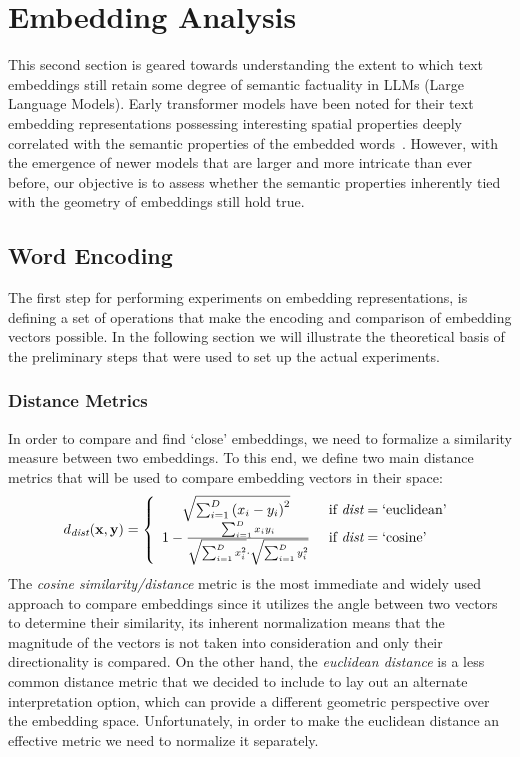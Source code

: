 \section{Embedding Analysis}\label{sec:method_embeddings}

This second section is geared towards understanding the extent to which text embeddings still retain some degree of semantic factuality in LLMs (Large Language Models).
Early transformer models have been noted for their text embedding representations possessing interesting spatial properties deeply correlated with the semantic properties of the embedded words~\cite{allen2019,kalinowski2020}.
However, with the emergence of newer models that are larger and more intricate than ever before, our objective is to assess whether the semantic properties inherently tied with the geometry of embeddings still hold true.

\subsection{Word Encoding}

The first step for performing experiments on embedding representations, is defining a set of operations that make the encoding and comparison of embedding vectors possible.
In the following section we will illustrate the theoretical basis of the preliminary steps that were used to set up the actual experiments.

\subsubsection{Distance Metrics}

In order to compare and find `close' embeddings, we need to formalize a similarity measure between two embeddings. 
To this end, we define two main distance metrics that will be used to compare embedding vectors in their space:
\begin{equation}
    d_{\textit{dist}}(\gbm{x}, \gbm{y}) = 
    \label{eq:method_embeddings_distance}
    \left\{
    \begin{array}{cl}
        \sqrt{\sum_{i=1}^{D}{{(x_i - y_i)}^2}} &\ \text{if}\ \textit{dist} = \text{`euclidean'} \\
        1 - \frac{\sum_{i=1}^{D}{x_i y_i}}{\sqrt{\sum_{i=1}^{D}{x_i^2}} \cdot \sqrt{\sum_{i=1}^{D}{y_i^2}}} &\ \text{if}\ \textit{dist} = \text{`cosine'}
    \end{array}
    \right.
\end{equation}
The \emph{cosine similarity/distance} metric is the most immediate and widely used approach to compare embeddings since it utilizes the angle between two vectors to determine their similarity, its inherent normalization means that the magnitude of the vectors is not taken into consideration and only their directionality is compared.
On the other hand, the \emph{euclidean distance} is a less common distance metric that we decided to include to lay out an alternate interpretation option, which can provide a different geometric perspective over the embedding space.
Unfortunately, in order to make the euclidean distance an effective metric we need to normalize it separately.

